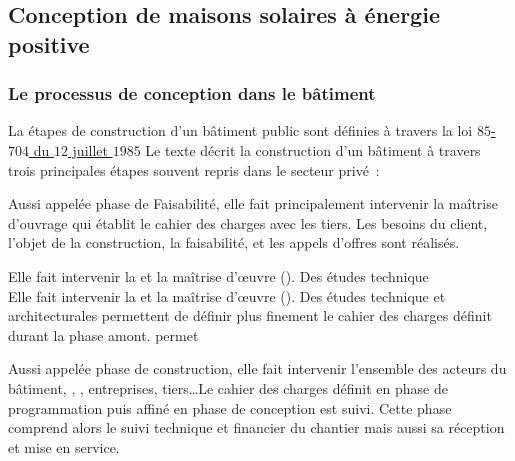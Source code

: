 \subsection{Conception de maisons solaires à énergie positive} %
\label{sub:conception_de_maisons_solaires_a_energie_positive}
\subsubsection{Le processus de conception dans le bâtiment} %
\label{ssub:le_processus_de_conception_dans_le_batiment}
La étapes de construction d’un bâtiment public sont définies à travers la loi
\href{https://www.legifrance.gouv.fr/affichTexte.do?cidTexte=JORFTEXT000000693683}{$85$-$704$ du $12$ juillet $1985$}
Le texte décrit la construction d’un bâtiment à travers trois principales étapes
souvent repris dans le secteur privé~:
\begin{description}[align=left]
    \item [Programmation]
          Aussi appelée phase de Faisabilité, elle fait principalement intervenir la
          maîtrise d’ouvrage qui établit le cahier des charges avec les tiers. Les besoins
          du client, l’objet de la construction, la faisabilité, et les appels d’offres
          sont réalisés.
    \item [Conception]
          Elle fait intervenir la  et la maîtrise d’œuvre (). Des études technique \\
          Elle fait intervenir la  et la maîtrise d’œuvre (). Des études technique
          et architecturales permettent de définir plus finement le cahier des charges
          définit durant la phase amont.
          permet
    \item [Réalisation]
          Aussi appelée phase de construction, elle fait intervenir l’ensemble des acteurs
          du bâtiment, , , entreprises, tiers\dots Le cahier des charges définit
          en phase de programmation puis affiné en phase de conception est suivi. Cette
          phase comprend alors le suivi technique et financier du chantier mais aussi sa
          réception et mise en service.
\end{description}

